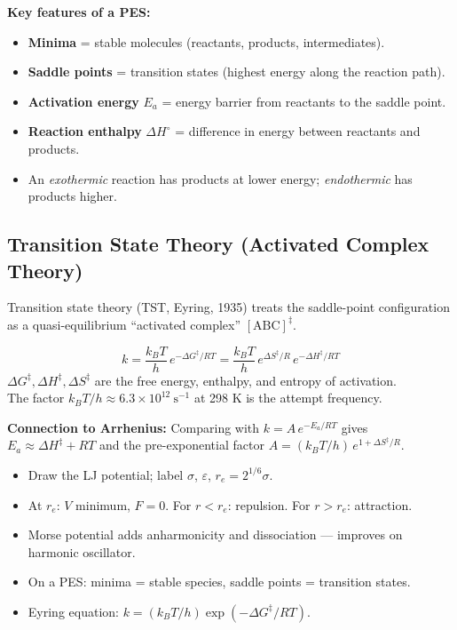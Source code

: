\documentclass[12pt,a4paper]{article}
\begin{document}
\textbf{Key features of a PES:}
\begin{itemize}[leftmargin=*, itemsep=2pt, topsep=2pt]
  \item \textbf{Minima} = stable molecules (reactants, products, intermediates).
  \item \textbf{Saddle points} = transition states (highest energy along the reaction path).
  \item \textbf{Activation energy} $E_a$ = energy barrier from reactants to the saddle point.
  \item \textbf{Reaction enthalpy} $\Delta H^\circ$ = difference in energy between reactants and products.
  \item An \emph{exothermic} reaction has products at lower energy; \emph{endothermic} has products higher.
\end{itemize}

\subsection{Transition State Theory (Activated Complex Theory)}
Transition state theory (TST, Eyring, 1935) treats the saddle-point configuration as a quasi-equilibrium ``activated complex'' $[\mathrm{ABC}]^\ddagger$.

\begin{tcolorbox}[formulabox, title={Eyring Rate Equation}]
\[
k = \frac{k_B T}{h}\,e^{-\Delta G^\ddagger/RT} = \frac{k_B T}{h}\,e^{\Delta S^\ddagger/R}\,e^{-\Delta H^\ddagger/RT}
\]
$\Delta G^\ddagger, \Delta H^\ddagger, \Delta S^\ddagger$ are the free energy, enthalpy, and entropy of activation.\\
The factor $k_B T/h \approx 6.3\times10^{12}\ \mathrm{s^{-1}}$ at 298 K is the attempt frequency.
\end{tcolorbox}

\textbf{Connection to Arrhenius:} Comparing with $k=A\,e^{-E_a/RT}$ gives $E_a \approx \Delta H^\ddagger + RT$ and the pre-exponential factor $A = (k_BT/h)\,e^{1+\Delta S^\ddagger/R}$.

\begin{tcolorbox}[exambox, title={Exam Points (Section 2)}]
\begin{itemize}[leftmargin=*, itemsep=2pt, topsep=2pt]
  \item Draw the LJ potential; label $\sigma$, $\varepsilon$, $r_e = 2^{1/6}\sigma$.
  \item At $r_e$: $V$ minimum, $F=0$. For $r<r_e$: repulsion. For $r>r_e$: attraction.
  \item Morse potential adds anharmonicity and dissociation — improves on harmonic oscillator.
  \item On a PES: minima = stable species, saddle points = transition states.
  \item Eyring equation: $k = (k_BT/h)\exp(-\Delta G^\ddagger/RT)$.
\end{itemize}
\end{tcolorbox}
\end{document}
